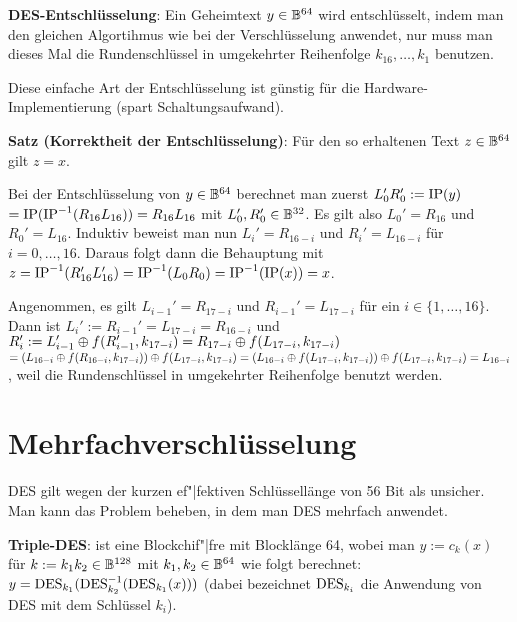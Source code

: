 \linie

\textbf{DES-Entschlüsselung}:
Ein Geheimtext $y \in \mathbb{B}^{64}$ wird entschlüsselt,
indem man den gleichen Algortihmus wie bei der Verschlüsselung anwendet,
nur muss man dieses Mal die Rundenschlüssel in umgekehrter Reihenfolge $k_{16}, \dotsc, k_1$
benutzen.

Diese einfache Art der Entschlüsselung ist günstig für die Hardware-Implementierung
(spart Schaltungsaufwand).

\textbf{Satz (Korrektheit der Entschlüsselung)}:
Für den so erhaltenen Text $z \in \mathbb{B}^{64}$ gilt $z = x$.

\begin{Beweis}
    Bei der Entschlüsselung von $y \in \mathbb{B}^{64}$ berechnet man zuerst
    $L_0' R_0' := \operatorname{IP}(y)$\\
    $= \operatorname{IP}(\operatorname{IP}^{-1}(R_{16} L_{16})) = R_{16} L_{16}$ mit
    $L_0', R_0' \in \mathbb{B}^{32}$.
    Es gilt also $L_0' = R_{16}$ und $R_0' = L_{16}$.
    Induktiv beweist man nun $L_i' = R_{16-i}$ und $R_i' = L_{16-i}$ für $i = 0, \dotsc, 16$.
    Daraus folgt dann die Behauptung mit
    $z = \operatorname{IP}^{-1}(R_{16}' L_{16}') = \operatorname{IP}^{-1}(L_0 R_0) = \operatorname{IP}^{-1}(\operatorname{IP}(x)) = x$.

    Angenommen, es gilt $L_{i-1}' = R_{17-i}$ und $R_{i-1}' = L_{17-i}$ für ein
    $i \in \{1, \dotsc, 16\}$.\\
    Dann ist $L_i' := R_{i-1}' = L_{17-i} = R_{16-i}$ und
    $R_i' := L_{i-1}' \oplus f(R_{i-1}', k_{17-i}) =
    R_{17-i} \oplus f(L_{17-i}, k_{17-i})$\\
    $= (L_{16-i} \oplus f(R_{16-i}, k_{17-i})) \oplus f(L_{17-i}, k_{17-i})
    = (L_{16-i} \oplus f(L_{17-i}, k_{17-i})) \oplus f(L_{17-i}, k_{17-i}) = L_{16-i}$,
    weil die Rundenschlüssel in umgekehrter Reihenfolge benutzt werden.
\end{Beweis}

\pagebreak

\section{%
    Mehrfachverschlüsselung%
}

DES gilt wegen der kurzen ef"|fektiven Schlüssellänge von 56 Bit als unsicher.
Man kann das Problem beheben, in dem man DES mehrfach anwendet.

\textbf{Triple-DES}:
 ist eine Blockchif"|fre mit Blocklänge 64, wobei man
$y := c_k(x)$ für $k := k_1 k_2 \in \mathbb{B}^{128}$ mit $k_1, k_2 \in \mathbb{B}^{64}$ wie folgt berechnet:
$y = \operatorname{DES}_{k_1}(\operatorname{DES}^{-1}_{k_2}(\operatorname{DES}_{k_1}(x)))$
(dabei bezeichnet $\operatorname{DES}_{k_i}$ die Anwendung von DES mit dem Schlüssel $k_i$).

